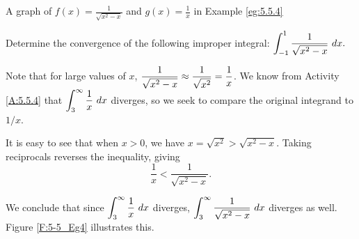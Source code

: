 \begin{marginfigure}[4cm]
\caption{A graph of $f(x)=\frac{1}{\sqrt{x^2-x}}$ and $g(x)= \frac{1}{x}$ in Example \ref{eg:5.5.4}}
\label{F:5-5_Eg4}
\end{marginfigure}

\begin{example} \label{eg:5.5.4} %
Determine the convergence of the following improper integral:
$\ds  \int_{-1}^1\frac{1}{\sqrt{x^2-x}}\ dx.$

\solution
Note that for large values of $x$, $\displaystyle \frac{1}{\sqrt{x^2-x}} \approx \frac{1}{\sqrt{x^2}} =\frac{1}{x}$. We know from Activity \ref{A:5.5.4} that  $\displaystyle \int_3^\infty \frac1x\ dx$ diverges, so we seek to compare the original integrand to $1/x$.

It is easy to see that when $x>0$, we have $x = \sqrt{x^2} > \sqrt{x^2-x}$. Taking reciprocals reverses the inequality, giving $$\frac1x < \frac1{\sqrt{x^2-x}}.$$

We conclude that since $\displaystyle\int_3^\infty\frac1x\ dx$ diverges, $\displaystyle\int_3^\infty\frac1{\sqrt{x^2-x}}\ dx$ diverges as well. Figure \ref{F:5-5_Eg4} illustrates this.
\end{example}